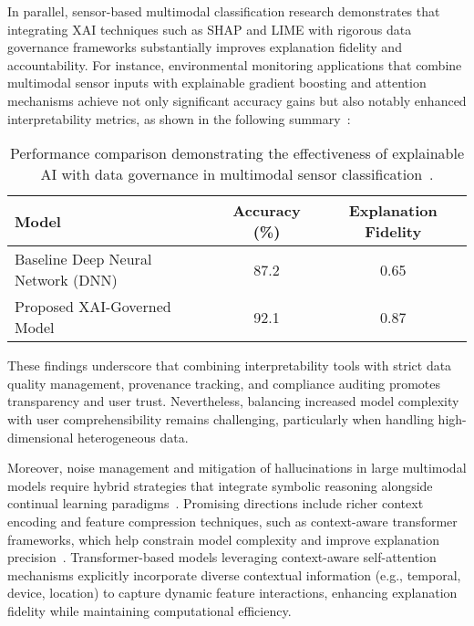 \documentclass[sigconf]{acmart}
\begin{document}
In parallel, sensor-based multimodal classification research demonstrates that integrating XAI techniques such as SHAP and LIME with rigorous data governance frameworks substantially improves explanation fidelity and accountability. For instance, environmental monitoring applications that combine multimodal sensor inputs with explainable gradient boosting and attention mechanisms achieve not only significant accuracy gains but also notably enhanced interpretability metrics, as shown in the following summary~\cite{ref25}:

\begin{table*}[htbp]
\centering
\caption{Performance comparison demonstrating the effectiveness of explainable AI with data governance in multimodal sensor classification~\cite{ref25}.}
\label{table:xai_governance_performance}
\begin{adjustbox}{max width=\textwidth}
\begin{tabular}{@{}lcc@{}}
\toprule
Model                      & Accuracy (\%) & Explanation Fidelity \\ \midrule
Baseline Deep Neural Network (DNN) & 87.2          & 0.65                 \\
Proposed XAI-Governed Model          & 92.1          & 0.87                 \\ \bottomrule
\end{tabular}
\end{adjustbox}
\end{table*}

These findings underscore that combining interpretability tools with strict data quality management, provenance tracking, and compliance auditing promotes transparency and user trust. Nevertheless, balancing increased model complexity with user comprehensibility remains challenging, particularly when handling high-dimensional heterogeneous data.

Moreover, noise management and mitigation of hallucinations in large multimodal models require hybrid strategies that integrate symbolic reasoning alongside continual learning paradigms~\cite{ref13,ref24,ref25}. Promising directions include richer context encoding and feature compression techniques, such as context-aware transformer frameworks, which help constrain model complexity and improve explanation precision~\cite{ref17}. Transformer-based models leveraging context-aware self-attention mechanisms explicitly incorporate diverse contextual information (e.g., temporal, device, location) to capture dynamic feature interactions, enhancing explanation fidelity while maintaining computational efficiency.
\end{document}
